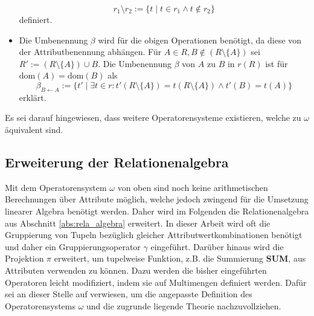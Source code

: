 \begin{itemize}
\begin{equation*}
        r_1 \setminus r_2:=\{ t \; | \; t \in r_1 \wedge t \notin r_2 \}
    \end{equation*}
    definiert.
    \item Die Umbenennung $\beta$ wird für die obigen Operationen benötigt, da diese von der Attributbenennung abhängen. Für $A \in R, B \notin (R \setminus \{A\})$ sei $R':=(R \setminus \{A\}) \cup B$. Die Umbenennung $\beta$ von $A$ zu $B$ in $r(R)$ ist für $\mathrm{dom}(A)=\mathrm{dom}(B)$ als
    \begin{equation*}
        \beta_{B \leftarrow A}:=\{t' \; | \; \exists t \in r: t'(R \setminus \{A\})=t(R \setminus \{A\}) \wedge t'(B)=t(A)\}
    \end{equation*}
    erklärt.
\end{itemize}
Es sei darauf hingewiesen, dass weitere Operatorensysteme existieren, welche zu $\omega$ äquivalent sind\cite{DBLP:books/daglib/0044627}.

\subsection*{Erweiterung der Relationenalgebra}

Mit dem Operatorensystem $\omega$ von oben sind noch keine arithmetischen Berechnungen über Attribute möglich, welche jedoch zwingend für die Umsetzung linearer Algebra benötigt werden. Daher wird im Folgenden die Relationenalgebra aus Abschnitt \ref{abs:rela_algebra} erweitert. In dieser Arbeit wird oft die Gruppierung von Tupeln bezüglich gleicher Attributwertkombinationen benötigt und daher ein Gruppierungsoperator $\gamma$ eingeführt. Darüber hinaus wird die Projektion $\pi$ erweitert, um tupelweise Funktion, z.B. die Summierung \textbf{SUM}, aus Attributen verwenden zu können.
Dazu werden die bisher eingeführten Operatoren leicht modifiziert, indem sie auf Multimengen definiert werden. Dafür sei an dieser Stelle auf \cite{DBLP:books/daglib/0020812} verwiesen, um die angepasste Definition des Operatorensystems $ \omega$ und die zugrunde liegende Theorie nachzuvollziehen.

